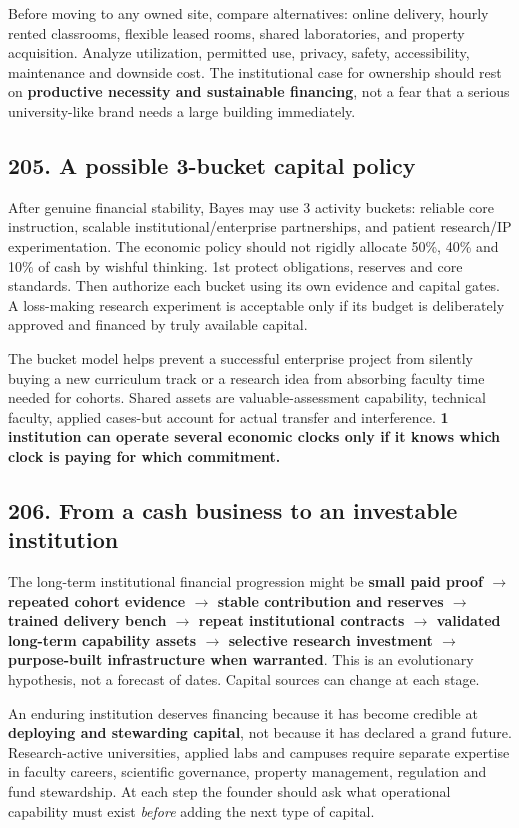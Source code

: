 Before moving to any owned site, compare alternatives: online delivery, hourly rented classrooms, flexible leased rooms, shared laboratories, and property acquisition. Analyze utilization, permitted use, privacy, safety, accessibility, maintenance and downside cost. The institutional case for ownership should rest on \textbf{productive necessity and sustainable financing}, not a fear that a serious university-like brand needs a large building immediately.

\subsection{205. A possible 3-bucket capital policy}


After genuine financial stability, Bayes may use 3 activity buckets: reliable core instruction, scalable institutional/enterprise partnerships, and patient research/IP experimentation. The economic policy should not rigidly allocate 50\%, 40\% and 10\% of cash by wishful thinking. 1st protect obligations, reserves and core standards. Then authorize each bucket using its own evidence and capital gates. A loss-making research experiment is acceptable only if its budget is deliberately approved and financed by truly available capital.

The bucket model helps prevent a successful enterprise project from silently buying a new curriculum track or a research idea from absorbing faculty time needed for cohorts. Shared assets are valuable-assessment capability, technical faculty, applied cases-but account for actual transfer and interference. \textbf{1 institution can operate several economic clocks only if it knows which clock is paying for which commitment.}

\subsection{206. From a cash business to an investable institution}


The long-term institutional financial progression might be \textbf{small paid proof $\to$ repeated cohort evidence $\to$ stable contribution and reserves $\to$ trained delivery bench $\to$ repeat institutional contracts $\to$ validated long-term capability assets $\to$ selective research investment $\to$ purpose-built infrastructure when warranted}. This is an evolutionary hypothesis, not a forecast of dates. Capital sources can change at each stage.

An enduring institution deserves financing because it has become credible at \textbf{deploying and stewarding capital}, not because it has declared a grand future. Research-active universities, applied labs and campuses require separate expertise in faculty careers, scientific governance, property management, regulation and fund stewardship. At each step the founder should ask what operational capability must exist \textit{before} adding the next type of capital.

